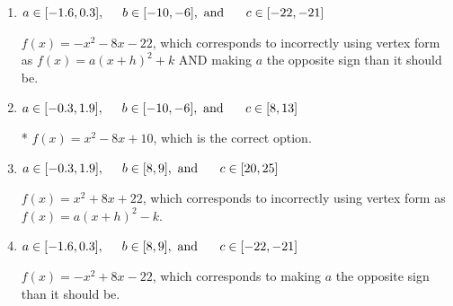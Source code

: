 \documentclass{extbook}[14pt]
\begin{document}
\begin{enumerate}
{\begin{enumerate}[label=\Alph*.]
$f(x)=x^{2} +8 x + 10$, which corresponds to incorrectly using vertex form as $f(x) = a(x+h)^2+k$.
\item \( a \in [-1.6, 0.3], \hspace*{5mm} b \in [-10, -6], \text{ and } \hspace*{5mm} c \in [-22, -21] \)

$f(x)=-x^{2} -8 x -22$, which corresponds to incorrectly using vertex form as $f(x) = a(x+h)^2+k$ AND making $a$ the opposite sign than it should be.
\item \( a \in [-0.3, 1.9], \hspace*{5mm} b \in [-10, -6], \text{ and } \hspace*{5mm} c \in [8, 13] \)

* $f(x)=x^{2} -8 x + 10$, which is the correct option.
\item \( a \in [-0.3, 1.9], \hspace*{5mm} b \in [8, 9], \text{ and } \hspace*{5mm} c \in [20, 25] \)

$f(x)=x^{2} +8 x + 22$, which corresponds to incorrectly using vertex form as $f(x) = a(x+h)^2 - k$.
\item \( a \in [-1.6, 0.3], \hspace*{5mm} b \in [8, 9], \text{ and } \hspace*{5mm} c \in [-22, -21] \)

$f(x)=-x^{2} +8 x -22$, which corresponds to making $a$ the opposite sign than it should be.
\end{enumerate}

}
\end{enumerate}
\end{document}
